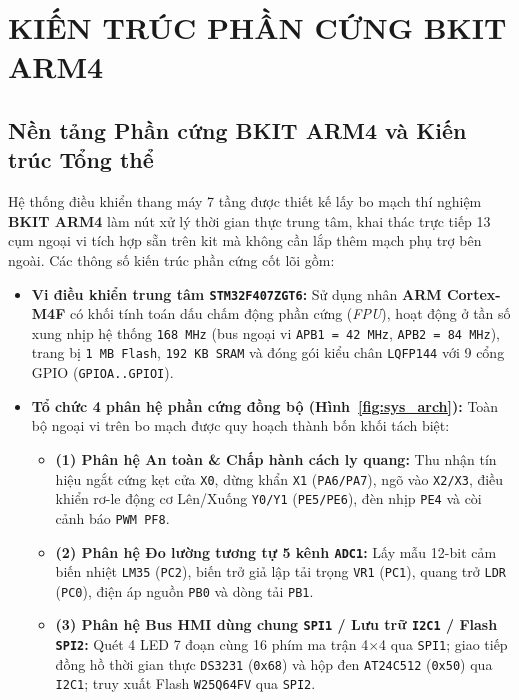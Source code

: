 \clearpage
\section{KIẾN TRÚC PHẦN CỨNG BKIT ARM4}

\subsection{Nền tảng Phần cứng BKIT ARM4 và Kiến trúc Tổng thể}
Hệ thống điều khiển thang máy 7 tầng được thiết kế lấy bo mạch thí nghiệm \textbf{BKIT ARM4} làm nút xử lý thời gian thực trung tâm, khai thác trực tiếp 13 cụm ngoại vi tích hợp sẵn trên kit mà không cần lắp thêm mạch phụ trợ bên ngoài. Các thông số kiến trúc phần cứng cốt lõi gồm:
\begin{itemize}[nosep]
    \item \textbf{Vi điều khiển trung tâm \texttt{STM32F407ZGT6}:} Sử dụng nhân \textbf{ARM Cortex-M4F} có khối tính toán dấu chấm động phần cứng (\textit{FPU}), hoạt động ở tần số xung nhịp hệ thống \texttt{168~MHz} (bus ngoại vi \texttt{APB1 = 42~MHz}, \texttt{APB2 = 84~MHz}), trang bị \texttt{1~MB Flash}, \texttt{192~KB SRAM} và đóng gói kiểu chân \texttt{LQFP144} với 9 cổng GPIO (\texttt{GPIOA..GPIOI}).
    \item \textbf{Tổ chức 4 phân hệ phần cứng đồng bộ (Hình~\ref{fig:sys_arch}):} Toàn bộ ngoại vi trên bo mạch được quy hoạch thành bốn khối tách biệt:
    \begin{itemize}[nosep]
        \item \textbf{(1) Phân hệ An toàn \& Chấp hành cách ly quang:} Thu nhận tín hiệu ngắt cứng kẹt cửa \texttt{X0}, dừng khẩn \texttt{X1} (\texttt{PA6/PA7}), ngõ vào \texttt{X2/X3}, điều khiển rơ-le động cơ Lên/Xuống \texttt{Y0/Y1} (\texttt{PE5/PE6}), đèn nhịp \texttt{PE4} và còi cảnh báo \texttt{PWM PF8}.
        \item \textbf{(2) Phân hệ Đo lường tương tự 5 kênh \texttt{ADC1}:} Lấy mẫu 12-bit cảm biến nhiệt \texttt{LM35} (\texttt{PC2}), biến trở giả lập tải trọng \texttt{VR1} (\texttt{PC1}), quang trở \texttt{LDR} (\texttt{PC0}), điện áp nguồn \texttt{PB0} và dòng tải \texttt{PB1}.
        \item \textbf{(3) Phân hệ Bus HMI dùng chung \texttt{SPI1} / Lưu trữ \texttt{I2C1} / Flash \texttt{SPI2}:} Quét 4 LED 7 đoạn cùng 16 phím ma trận 4$\times$4 qua \texttt{SPI1}; giao tiếp đồng hồ thời gian thực \texttt{DS3231} (\texttt{0x68}) và hộp đen \texttt{AT24C512} (\texttt{0x50}) qua \texttt{I2C1}; truy xuất Flash \texttt{W25Q64FV} qua \texttt{SPI2}.

\end{itemize}
\end{itemize}
